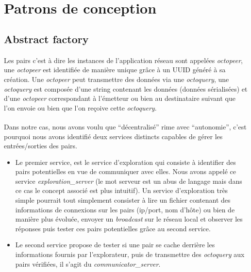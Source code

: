 \documentclass[a4paper]{article}
\begin{document}
		\newpage

	\section{Patrons de conception}
	
		\subsection{Abstract factory}
		
			\paragraph{}{
			Les pairs c’est à dire les instances de l’application réseau sont appelées \textit{octopeer}, 
			une \textit{octopeer} est identifiée de manière unique grâce à un UUID généré à sa création. \newline
			Une \textit{octopeer} peut transmettre des données via une \textit{octoquery}, une \textit{octoquery} est composée
			 d’une string contenant les données (données sérialisées) et d’une \textit{octopeer} correspondant à 
			 l’émetteur ou bien au destinataire suivant que l’on envoie ou bien que l’on reçoive cette \textit{octoquery}.
			}
			
			\paragraph{}{
			Dans notre cas, nous avons voulu que “décentralisé” rime avec “autonomie”, c’est pourquoi nous 
			avons identifié deux services distincts capables de gérer les entrées/sorties des pairs.
			}
			\begin{itemize}
				\item Le premier service, est le service d’exploration qui consiste à identifier des pairs
				potentielles en vue de communiquer avec elles. Nous avons appelé ce service \textit{exploration\_server} 
				(le mot serveur est un abus de langage mais dans ce cas le concept associé est plus intuitif). 
				Un service d’exploration très simple pourrait tout simplement consister à lire un fichier contenant
				des informations de connexions sur les pairs (ip/port, nom d’hôte) ou bien de manière plus évoluée, 
				envoyer un \textit{broadcast} sur le réseau local et observer les réponses puis tester ces pairs potentielles 
				grâce au second service.
				
				\item Le second service propose de tester si une pair se cache derrière les informations fournis 
				par l’explorateur, puis de transmettre des \textit{octoquery} aux pairs vérifiées, il s’agit du \textit{communicator\_server}.
			\end{itemize}
			
\end{document}
